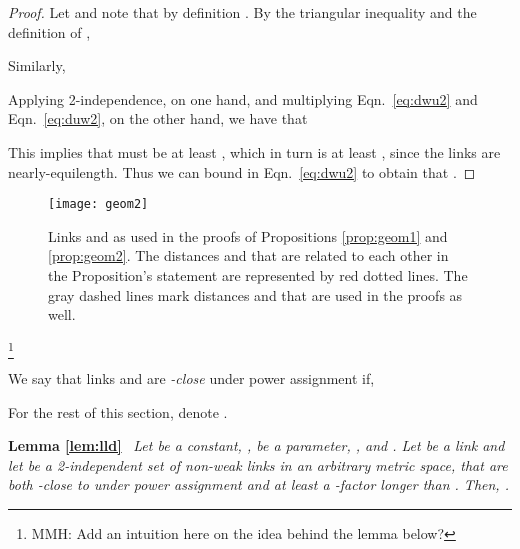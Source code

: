 \documentclass[11pt]{amsart}
\begin{document}
\begin{proof}
Let  and note that by definition .
By the triangular inequality and the definition of , 

Similarly, 

Applying 2-independence, on one hand, and multiplying Eqn.\ \ref{eq:dwu2} and Eqn.\ \ref{eq:duw2}, on the other hand, we have that

This implies that  must be at least , which in turn is at least , since the links are nearly-equilength.
Thus we can bound  in Eqn.\ \ref{eq:dwu2} to obtain that .
\end{proof}
\begin{figure*}[ht]
	\begin{center}
		\texttt{[image: geom2]}
	\end{center}
	\caption{Links  and  as used in the proofs of Propositions \ref{prop:geom1} and \ref{prop:geom2}. The distances  and  that are related to each other in the Proposition's statement are represented by red dotted lines. The gray dashed lines mark distances  and  that are used in the proofs as well.}\label{fig:geom2}
\end{figure*}

\footnote{MMH: Add an intuition here on the idea behind the lemma below?}

\begin{defn}
We say that links  and  are \emph{-close} under
power assignment  if, 
\end{defn}

For the rest of this section, denote .

\smallskip

\noindent \textbf{Lemma \ref{lem:lld}}\ 
\emph{
Let  be a constant, ,  be a parameter, , and . 
Let  be a link and 
let  be a 2-independent set of non-weak links in an arbitrary
metric space, that are both -close to 
under power assignment  and at least a -factor longer than .
Then, .
}
\smallskip
\end{document}
